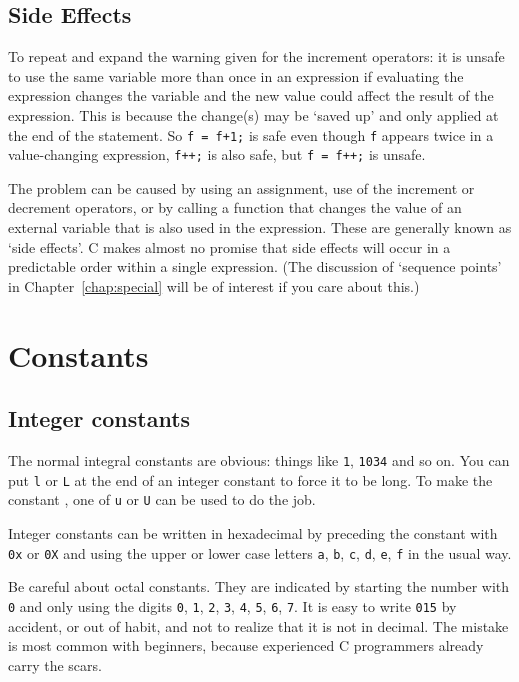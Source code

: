   

  \subsection{Side Effects}
   

   To repeat and expand the warning given for the increment operators: it
    is unsafe to use the same variable more than once in an expression if
    evaluating the expression changes the variable and the new value could
    affect the result of the expression. This is because the change(s) may be
    `saved up' and only applied at the end of the statement.
    So \texttt{f = f+1;} is safe even though \texttt{f}
    appears twice in a value-changing expression, \texttt{f++;} is
    also safe, but \texttt{f = f++;} is unsafe.


   The problem can be caused by using an assignment, use of the increment
    or decrement operators, or by calling a function that changes the value of
    an external variable that is also used in the expression. These are
    generally known as `side effects'. C makes almost no promise
    that side effects will occur in a predictable order within a single
    expression.
    (The discussion of `sequence points' in Chapter~\ref{chap:special}
    will be of interest if you care about this.)


  

 
        \section{Constants}
        

  

  \subsection{Integer constants}
   

   The normal integral constants are obvious: things
    like \texttt{1}, \texttt{1034} and so on. You can
    put \texttt{l} or \texttt{L} at the end of an integer
    constant to force it to be long. To make the constant
    \unsigned, one of \texttt{u} or \texttt{U}
    can be used to do the job.


   Integer constants can be written in hexadecimal by preceding the
    constant with \texttt{0x} or \texttt{0X} and using the
    upper or lower case letters \texttt{a}, \texttt{b},
    \texttt{c}, \texttt{d}, \texttt{e}, \texttt{f} in the
    usual way.


   Be careful about octal constants. They are indicated by starting the
    number with \texttt{0} and only using the
    digits \texttt{0}, \texttt{1}, \texttt{2},
    \texttt{3}, \texttt{4}, \texttt{5}, \texttt{6},
    \texttt{7}. It is easy to write \texttt{015} by accident, or
    out of habit, and not to realize that it is not in decimal. The mistake is
    most common with beginners, because experienced C programmers already
    carry the scars.


